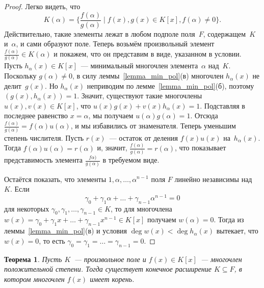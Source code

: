 \documentclass[a4paper,10pt]{amsart}
\newtheorem{theorem}{Теорема}
\theoremstyle{definition}
\theoremstyle{remark}
\begin{document}
\begin{proof}
	Легко видеть, что
	$$
	K(\alpha) = \lbrace \frac{f(\alpha)}{g(\alpha)} \mid f(x), g(x) \in
	K[x], f(\alpha) \ne 0 \rbrace.
	$$
	Действительно, такие элементы лежат в любом подполе поля~$F$,
	содержащем~$K$ и~$\alpha$, и сами образуют поле. Теперь возьмём
	произвольный элемент $\frac{f(\alpha)}{g(\alpha)} \in K(\alpha)$ и
	покажем, что он представим в виде, указанном в условии. Пусть
	$h_\alpha(x) \in K[x]$~--- минимальный многочлен элемента~$\alpha$
	над~$K$. Поскольку $g(\alpha) \ne 0$, в силу
	леммы~\ref{lemma_min_pol}(в) многочлен $h_\alpha(x)$ не
	делит~$g(x)$. Но $h_\alpha(x)$ неприводим по
	лемме~\ref{lemma_min_pol}(б), поэтому $(g(x), h_\alpha(x)) = 1$.
	Значит, существуют такие многочлены $u(x), v(x) \in K[x]$, что $u(x)
	g(x) + v(x) h_\alpha(x) = 1$. Подставляя в последнее равенство $x =
	\alpha$, мы получаем $u(\alpha) g(\alpha) = 1$. Отсюда
	$\frac{f(\alpha)}{g(\alpha)} = f(\alpha) u(\alpha)$, и мы избавились
	от знаменателя. Теперь уменьшим степень числителя. Пусть $r(x)$~---
	остаток от деления $f(x)u(x)$ на~$h_\alpha(x)$. Тогда $f(\alpha)
	u(\alpha) = r(\alpha)$ и, значит, $\frac{f(\alpha)}{g(\alpha)} =
	r(\alpha)$, что показывает представимость элемента
	$\frac{f\alpha)}{g(\alpha)}$ в требуемом виде.
	
	Остаётся показать, что элементы $1, \alpha, \ldots, \alpha^{n-1}$
	поля $F$ линейно независимы над~$K$. Если $$\gamma_0 + \gamma_1
	\alpha + \ldots + \gamma_{n-1} \alpha^{n-1} = 0$$ для некоторых
	$\gamma_0, \gamma_1, \ldots, \gamma_{n-1} \in K$, то для многочлена
	$w(x) = \gamma_0 + \gamma_1x + \ldots + \gamma_{n-1}x^{n-1} \in
	K[x]$ получаем $w(\alpha) = 0$. Тогда из
	леммы~\ref{lemma_min_pol}(в) и условия $\deg w(x) < \deg
	h_\alpha(x)$ вытекает, что $w(x) = 0$, то есть $\gamma_0 = \gamma_1
	= \ldots = \gamma_{n-1} = 0$.
\end{proof}

\begin{theorem}
	Пусть $K$~--- произвольное поле и $f(x)\in K[x]$~--- многочлен
	положительной степени. Тогда существует конечное расширение
	$K\subseteq F$, в котором многочлен $f(x)$ имеет корень.
\end{theorem}
\end{document}
